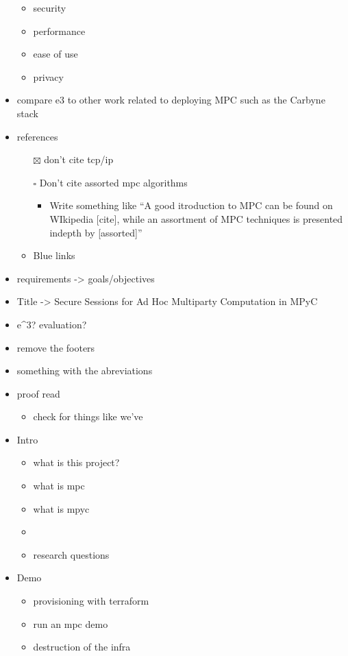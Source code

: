 \begin{itemize}
  \begin{itemize}
  \tightlist
  \item
    security
  \item
    performance
  \item
    ease of use
  \item
    privacy
  \end{itemize}
\item
  compare \gls{e3} to other work related to deploying MPC such as the
  Carbyne stack\autocite{robertboschgmbhCarbyneStack2022}
\item
  references

  \begin{itemize}
  \tightlist
  \item[$\boxtimes$]
    don't cite tcp/ip
  \item[$\square$]
    Don't cite assorted mpc algorithms

    \begin{itemize}
    \tightlist
    \item
      Write something like ``A good itroduction to MPC can be found on
      WIkipedia {[}cite{]}, while an assortment of MPC techniques is
      presented indepth by {[}assorted{]}''
    \end{itemize}
  \item
    Blue links
  \end{itemize}
\item
  requirements -\textgreater{} goals/objectives
\item
  Title -\textgreater{} Secure Sessions for Ad Hoc Multiparty
  Computation in MPyC
\item
  e\^{}3? evaluation?
\item
  remove the footers
\item
  something with the abreviations
\item
  proof read

  \begin{itemize}
  \tightlist
  \item
    check for things like we've
  \end{itemize}
\item
  Intro

  \begin{itemize}
  \tightlist
  \item
    what is this project?
  \item
    what is mpc
  \item
    what is mpyc
  \item
  \item
    research questions
  \end{itemize}
\item
  Demo

  \begin{itemize}
  \tightlist
  \item
    provisioning with terraform
  \item
    run an mpc demo
  \item
    destruction of the infra
  \end{itemize}
\end{itemize}
